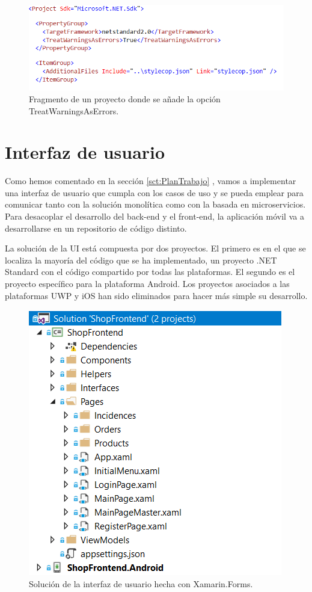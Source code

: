 \documentclass[11pt,spanish,listoffigures]{tfgetsinf}
\begin{document}
\begin{figure}[h]
\centering
\includegraphics[scale=0.9]{TreatWarning}
\caption{Fragmento de un proyecto donde se añade la opción TreatWarningsAsErrors.}
\end{figure}

\section{Interfaz de usuario}

Como hemos comentado en la sección \ref{sct:PlanTrabajo} , vamos a implementar una interfaz de usuario que cumpla con los casos de uso y se pueda emplear para comunicar tanto con la solución monolítica como con la basada en microservicios. Para desacoplar el desarrollo del back-end y el front-end, la aplicación móvil va a desarrollarse en un repositorio de código distinto.

La solución de la UI está compuesta por dos proyectos. El primero es en el que se localiza la mayoría del código que se ha implementado, un proyecto .NET Standard con el código compartido por todas las plataformas. El segundo es el proyecto específico para la plataforma Android. Los proyectos asociados a las plataformas UWP y iOS han sido eliminados para hacer más simple su desarrollo.

\begin{figure}[h]
\centering
\includegraphics[scale=0.8]{ShopFrontEnd}
\caption{Solución de la interfaz de usuario hecha con Xamarin.Forms.}
\end{figure}
\end{document}
